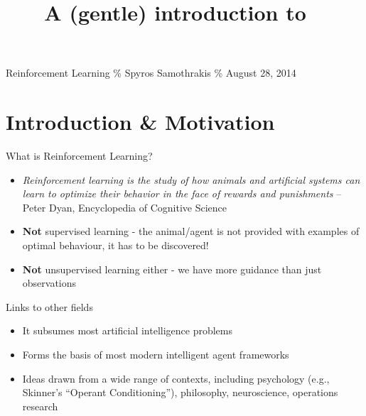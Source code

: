\documentclass[]{beamer}
\title{A (gentle) introduction to ~}
\date{}
\providecommand{\tightlist}{%
  \setlength{\itemsep}{0pt}\setlength{\parskip}{0pt}}
\begin{document}
\frame{\titlepage}

\begin{frame}
\tableofcontents[hideallsubsections]
\end{frame}

\begin{frame}

Reinforcement Learning \% Spyros Samothrakis \% August 28, 2014

\end{frame}

\section{Introduction \& Motivation}\label{introduction-motivation}

\usebackgroundtemplate{

}

\begin{frame}{What is Reinforcement Learning?}

\begin{itemize}
\tightlist
\item
  \emph{Reinforcement learning is the study of how animals and
  artificial systems can learn to optimize their behavior in the face of
  rewards and punishments} -- Peter Dyan, Encyclopedia of Cognitive
  Science
\item
  \textbf{Not} supervised learning - the animal/agent is not provided
  with examples of optimal behaviour, it has to be discovered!
\item
  \textbf{Not} unsupervised learning either - we have more guidance than
  just observations
\end{itemize}

\end{frame}

\begin{frame}{Links to other fields}

\begin{itemize}
\tightlist
\item
  It subsumes most artificial intelligence problems
\item
  Forms the basis of most modern intelligent agent frameworks
\item
  Ideas drawn from a wide range of contexts, including psychology (e.g.,
  Skinner's ``Operant Conditioning''), philosophy, neuroscience,
  operations research
\end{itemize}

\end{frame}
\end{document}
